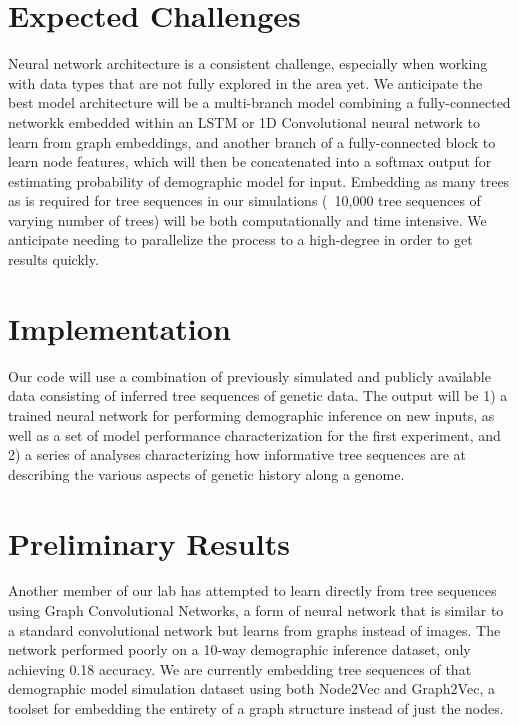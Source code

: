 \documentclass{article}
\begin{document}
\section{Expected Challenges}
Neural network architecture is a consistent challenge, especially when working with data types that are not fully explored in the area yet. We anticipate the best model architecture will be a multi-branch model combining a fully-connected networkk embedded within an LSTM or 1D Convolutional neural network to learn from graph embeddings, and another branch of a fully-connected block to learn node features, which will then be concatenated into a softmax output for estimating probability of demographic model for input.
Embedding as many trees as is required for tree sequences in our simulations (~10,000 tree sequences of varying number of trees) will be both computationally and time intensive. We anticipate needing to parallelize the process to a high-degree in order to get results quickly.

\section{Implementation}
Our code will use a combination of previously simulated and publicly available data consisting of inferred tree sequences of genetic data. The output will be 1) a trained neural network for performing demographic inference on new inputs, as well as a set of model performance characterization for the first experiment, and 2) a series of analyses characterizing how informative tree sequences are at describing the various aspects of genetic history along a genome.

\section{Preliminary Results}
Another member of our lab has attempted to learn directly from tree sequences using Graph Convolutional Networks, a form of neural network that is similar to a standard convolutional network but learns from graphs instead of images. The network performed poorly on a 10-way demographic inference dataset, only achieving 0.18 accuracy.
We are currently embedding tree sequences of that demographic model simulation dataset using both Node2Vec and Graph2Vec, a toolset for embedding the entirety of a graph structure instead of just the nodes.
\end{document}
